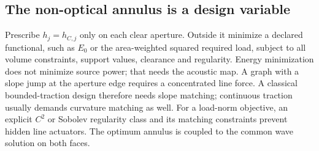 \subsection{The non-optical annulus is a design variable}
Prescribe $h_j=h_{C,j}$ only on each clear aperture. Outside it minimize a
declared functional, such as $E_0$ or the area-weighted squared required load,
subject to all volume constraints, support values, clearance and regularity.
Energy minimization does not minimize source power; that needs the acoustic
map. A graph with a slope jump at the aperture edge requires a concentrated
line force. A classical bounded-traction design therefore needs slope matching;
continuous traction usually demands curvature matching as well. For a
load-norm objective, an explicit $C^2$ or Sobolev regularity class and its
matching constraints prevent hidden line actuators. The optimum annulus is
coupled to the common wave solution on both faces.
